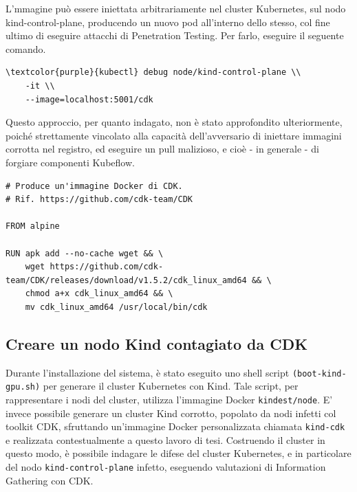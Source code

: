 L'mmagine può essere iniettata arbitrariamente nel cluster Kubernetes, sul nodo kind-control-plane, producendo un nuovo pod all'interno dello stesso, col fine ultimo di eseguire attacchi di Penetration Testing. Per farlo, eseguire il seguente comando.

\begin{small}
\begin{Verbatim}[commandchars=\\\{\}]
\textcolor{purple}{kubectl} debug node/kind-control-plane \\
    -it \\
    --image=localhost:5001/cdk
\end{Verbatim}
\end{small}

Questo approccio, per quanto indagato, non è stato approfondito ulteriormente, poiché strettamente vincolato alla capacità dell'avversario di iniettare immagini corrotta nel registro, ed eseguire un pull malizioso, e cioè - in generale - di forgiare componenti Kubeflow.

\begin{code}
\label{code:apx:a:dockerfile}
\begin{verbatim}
# Produce un'immagine Docker di CDK.
# Rif. https://github.com/cdk-team/CDK

FROM alpine

RUN apk add --no-cache wget && \
    wget https://github.com/cdk-team/CDK/releases/download/v1.5.2/cdk_linux_amd64 && \
    chmod a+x cdk_linux_amd64 && \
    mv cdk_linux_amd64 /usr/local/bin/cdk
\end{verbatim}
\end{code}

\subsection{Creare un nodo Kind contagiato da CDK}

Durante l'installazione del sistema, è stato eseguito uno shell script {\small \verb|(boot-kind-gpu.sh)|} per generare il cluster Kubernetes con Kind. Tale script, per rappresentare i nodi del cluster, utilizza l'immagine Docker {\small \verb|kindest/node|}. E' invece possibile generare un cluster Kind corrotto, popolato da nodi infetti col toolkit CDK, sfruttando un'immagine Docker personalizzata chiamata {\small \verb|kind-cdk|} e realizzata contestualmente a questo lavoro di tesi. Costruendo il cluster in questo modo, è possibile indagare le difese del cluster Kubernetes, e in particolare del nodo {\small \verb|kind-control-plane|} infetto, eseguendo valutazioni di Information Gathering con CDK.

